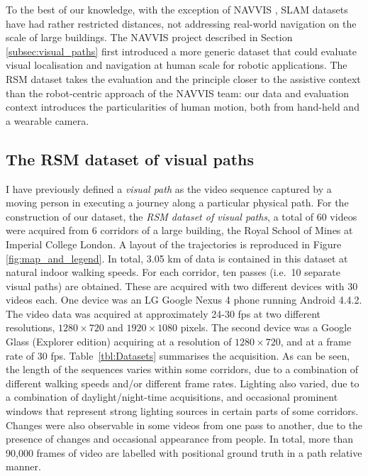 To the best of our knowledge, with the exception of NAVVIS \cite{Huitl2012}, SLAM datasets have had rather restricted distances, not addressing real-world navigation on the scale of large buildings. The NAVVIS project described in Section \ref{subsec:visual_paths} first introduced a more generic dataset that could evaluate visual localisation and navigation at human scale for robotic applications. The RSM dataset takes the evaluation and the principle closer to the assistive context than the robot-centric approach of the NAVVIS team: our data and evaluation context introduces the particularities of human motion, both from hand-held and a wearable camera.

\subsection{The RSM dataset of visual paths}

I have previously defined a \textit{visual path} as the video sequence captured by a moving person in executing a journey along a particular physical path. For the construction of our dataset, the \textit{RSM dataset of visual paths}, a total of 60 videos were acquired from 6 corridors of a large building, the Royal School of Mines at Imperial College London. A layout of the trajectories is reproduced in Figure \ref{fig:map_and_legend}. In total, 3.05 km of data is contained in this dataset at natural indoor walking speeds.  For each corridor, ten passes (i.e.\ 10 separate visual paths) are obtained. These are acquired with two different devices with 30 videos each. One device was an LG Google Nexus 4 phone running Android 4.4.2.  The video data was acquired at approximately 24-30 fps at two different resolutions, $1280 \times 720$ and $1920\times 1080$ pixels.  The second device was a Google Glass (Explorer edition) acquiring at a resolution of $1280 \times 720$, and at a frame rate of 30 fps. Table~\ref{tbl:Datasets} summarises the acquisition.  As can be seen, the length of the sequences varies within some corridors, due to a combination of different walking speeds and/or different frame rates. Lighting also varied, due to a combination of daylight/night-time acquisitions, and occasional prominent windows that represent strong lighting sources in certain parts of some corridors.  Changes were also observable in some videos from one pass to another, due to the presence of changes and occasional appearance from people. In total, more than 90,000 frames of video are labelled with positional ground truth in a path relative manner. 

